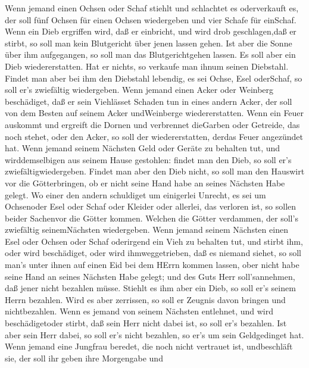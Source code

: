  Wenn jemand einen Ochsen oder Schaf stiehlt und schlachtet
es oderverkauft es, der soll fünf Ochsen für einen Ochsen wiedergeben
und vier Schafe für einSchaf.  Wenn ein Dieb ergriffen wird,
daß er einbricht, und wird drob geschlagen,daß er stirbt, so soll man
kein Blutgericht über jenen lassen gehen.  Ist aber die
Sonne über ihm aufgegangen, so soll man das Blutgerichtgehen lassen. Es
soll aber ein Dieb wiedererstatten. Hat er nichts, so verkaufe man ihnum
seinen Diebstahl.  Findet man aber bei ihm den Diebstahl
lebendig, es sei Ochse, Esel oderSchaf, so soll er's zwiefältig
wiedergeben.  Wenn jemand einen Acker oder Weinberg
beschädiget, daß er sein Viehlässet Schaden tun in eines andern Acker,
der soll von dem Besten auf seinem Acker undWeinberge wiedererstatten.
 Wenn ein Feuer auskommt und ergreift die Dornen und
verbrennet dieGarben oder Getreide, das noch stehet, oder den Acker, so
soll der wiedererstatten, derdas Feuer angezündet hat.  Wenn
jemand seinem Nächsten Geld oder Geräte zu behalten tut, und
wirddemselbigen aus seinem Hause gestohlen: findet man den Dieb, so soll
er's zwiefältigwiedergeben.  Findet man aber den Dieb nicht,
so soll man den Hauswirt vor die Götterbringen, ob er nicht seine Hand
habe an seines Nächsten Habe gelegt.  Wo einer den andern
schuldiget um einigerlei Unrecht, es sei um Ochsenoder Esel oder Schaf
oder Kleider oder allerlei, das verloren ist, so sollen beider Sachenvor
die Götter kommen. Welchen die Götter verdammen, der soll's zwiefältig
seinemNächsten wiedergeben.  Wenn jemand seinem Nächsten
einen Esel oder Ochsen oder Schaf oderirgend ein Vieh zu behalten tut,
und stirbt ihm, oder wird beschädiget, oder wird ihmweggetrieben, daß es
niemand siehet,  so soll man's unter ihnen auf einen Eid
bei dem HErrn kommen lassen, ober nicht habe seine Hand an seines
Nächsten Habe gelegt; und des Guts Herr soll'sannehmen, daß jener nicht
bezahlen müsse.  Stiehlt es ihm aber ein Dieb, so soll er's
seinem Herrn bezahlen.  Wird es aber zerrissen, so soll er
Zeugnis davon bringen und nichtbezahlen.  Wenn es jemand
von seinem Nächsten entlehnet, und wird beschädigetoder stirbt, daß sein
Herr nicht dabei ist, so soll er's bezahlen.  Ist aber sein
Herr dabei, so soll er's nicht bezahlen, so er's um sein Geldgedinget
hat.  Wenn jemand eine Jungfrau beredet, die noch nicht
vertrauet ist, undbeschläft sie, der soll ihr geben ihre Morgengabe und
